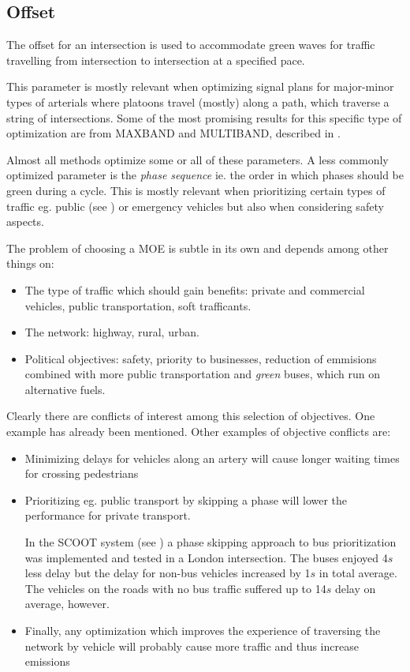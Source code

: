\subsection*{Offset}
The offset for an intersection is used to accommodate green waves for traffic travelling from intersection to intersection at a specified pace.

This parameter is mostly relevant when optimizing signal plans for major-minor types of arterials where platoons travel (mostly) along a path, which traverse a string of intersections. Some of the most promising results for this specific type of optimization are from MAXBAND and MULTIBAND, described in \cite{37}.

Almost all methods optimize some or all of these parameters. A less commonly optimized parameter is the \textit{phase sequence} ie. the order in which phases should be green during a cycle. This is mostly relevant when prioritizing certain types of traffic eg. public (see \cite{scoot2004}) or emergency vehicles but also when considering safety aspects.

The problem of choosing a MOE is subtle in its own and depends among other things on:

\begin{itemize}
\item The type of traffic which should gain benefits: private and commercial vehicles, public transportation, soft trafficants.
\item The network: highway, rural, urban.
\item Political objectives: safety, priority to businesses, reduction of emmisions combined with more public transportation and \textit{green} buses, which run on alternative fuels.
\end{itemize}

Clearly there are conflicts of interest among this selection of objectives. One example has already been mentioned. Other examples of objective conflicts are:

\begin{itemize}
\item Minimizing delays for vehicles along an artery will cause longer waiting times for crossing pedestrians
\item Prioritizing eg. public transport by skipping a phase will lower the performance for private transport. 

In the SCOOT system (see \cite{scoot2004}) a phase skipping approach to bus prioritization was implemented and tested in a London intersection. The buses enjoyed 4$s$ less delay but the delay for non-bus vehicles increased by 1$s$ in total average. The vehicles on the roads with no bus traffic suffered up to 14$s$ delay on average, however.
\item Finally, any optimization which improves the experience of traversing the network by vehicle will probably cause more traffic and thus increase emissions
\end{itemize}

